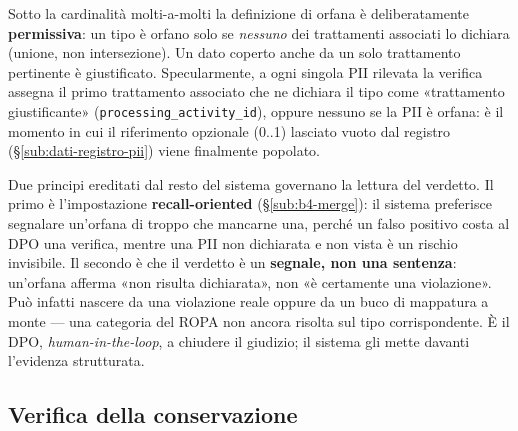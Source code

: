 Sotto la cardinalità molti-a-molti la definizione di orfana è deliberatamente \textbf{permissiva}: un tipo è orfano solo se \emph{nessuno} dei trattamenti associati lo dichiara (unione, non intersezione). Un dato coperto anche da un solo trattamento pertinente è giustificato. Specularmente, a ogni singola PII rilevata la verifica assegna il primo trattamento associato che ne dichiara il tipo come «trattamento giustificante» (\texttt{processing\_activity\_id}), oppure nessuno se la PII è orfana: è il momento in cui il riferimento opzionale (0..1) lasciato vuoto dal registro (§\ref{sub:dati-registro-pii}) viene finalmente popolato.

Due principi ereditati dal resto del sistema governano la lettura del verdetto. Il primo è l'impostazione \textbf{recall-oriented} (§\ref{sub:b4-merge}): il sistema preferisce segnalare un'orfana di troppo che mancarne una, perché un falso positivo costa al DPO una verifica, mentre una PII non dichiarata e non vista è un rischio invisibile. Il secondo è che il verdetto è un \textbf{segnale, non una sentenza}: un'orfana afferma «non risulta dichiarata», non «è certamente una violazione». Può infatti nascere da una violazione reale oppure da un buco di mappatura a monte --- una categoria del ROPA non ancora risolta sul tipo corrispondente. È il DPO, \emph{human-in-the-loop}, a chiudere il giudizio; il sistema gli mette davanti l'evidenza strutturata.

\subsection{Verifica della conservazione}
\label{sub:b7-retention}

